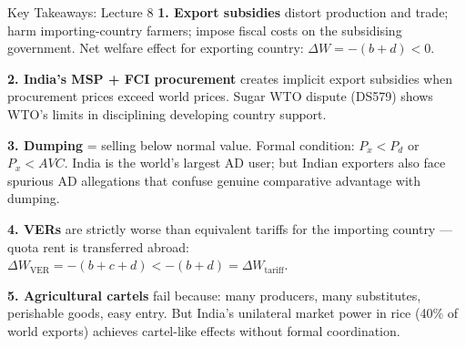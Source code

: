 \documentclass[
  ignorenonframetext,
  aspectratio=169,
]{beamer}
\makeatletter
\let\quarto@originallabel\label
\DeclareRobustCommand*{\label}[1]{\quarto@originallabel{#1}}
\makeatother
\begin{document}
\begin{frame}{Key Takeaways: Lecture 8}
\label{key-takeaways-lecture-8}
\textbf{1. Export subsidies} distort production and trade; harm
importing-country farmers; impose fiscal costs on the subsidising
government. Net welfare effect for exporting country:
\(\Delta W = -(b+d) < 0\).

\textbf{2. India's MSP + FCI procurement} creates implicit export
subsidies when procurement prices exceed world prices. Sugar WTO dispute
(DS579) shows WTO's limits in disciplining developing country support.

\textbf{3. Dumping} = selling below normal value. Formal condition:
\(P_x < P_d\) or \(P_x < AVC\). India is the world's largest AD user;
but Indian exporters also face spurious AD allegations that confuse
genuine comparative advantage with dumping.

\textbf{4. VERs} are strictly worse than equivalent tariffs for the
importing country --- quota rent is transferred abroad:
\(\Delta W_{\text{VER}} = -(b+c+d) < -(b+d) = \Delta W_{\text{tariff}}\).

\textbf{5. Agricultural cartels} fail because: many producers, many
substitutes, perishable goods, easy entry. But India's unilateral market
power in rice (40\% of world exports) achieves cartel-like effects
without formal coordination.

\end{frame}
\end{document}
